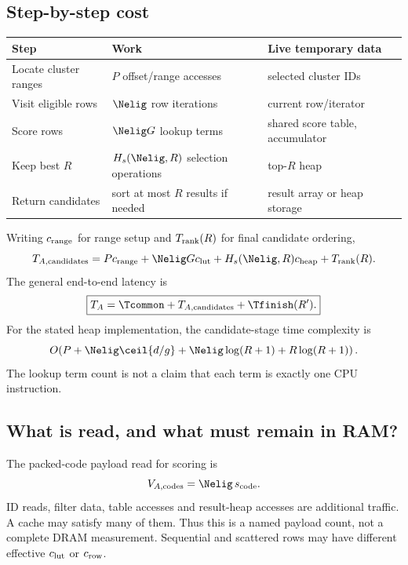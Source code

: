 \subsection{Step-by-step cost}
\begin{center}\small
\begin{tabularx}{\linewidth}{@{}P{.25\linewidth}YP{.23\linewidth}@{}}\toprule
Step & Work & Live temporary data\\\midrule
Locate cluster ranges & $P$ offset/range accesses & selected cluster IDs\\
Visit eligible rows & $\Nelig$ row iterations & current row/iterator\\
Score rows & $\Nelig G$ lookup terms & shared score table, accumulator\\
Keep best $R$ & $H_s(\Nelig,R)$ selection operations & top-$R$ heap\\
Return candidates & sort at most $R$ results if needed & result array or heap storage\\\bottomrule
\end{tabularx}\normalsize\end{center}

Writing $c_{\rm range}$ for range setup and $T_{\rm rank}(R)$ for final candidate ordering,
\begin{equation}
T_{A,\rm candidates}=P c_{\rm range}+\Nelig G c_{\rm lut}
                    +H_s(\Nelig,R)c_{\rm heap}+T_{\rm rank}(R).
\label{eq:scan-time}
\end{equation}
The general end-to-end latency is
\begin{equation}
\boxed{T_A=\Tcommon+T_{A,\rm candidates}+\Tfinish(R').}
\label{eq:scan-total}
\end{equation}
For the stated heap implementation, the candidate-stage time complexity is
\[
O\!\left(P+\Nelig\ceil{d/g}+\Nelig\log(R+1)+R\log(R+1)\right).
\]
The lookup term count is not a claim that each term is exactly one CPU instruction.

\subsection{What is read, and what must remain in RAM?}
The packed-code payload read for scoring is
\begin{equation}
V_{A,\rm codes}=\Nelig\,s_{\rm code}.
\end{equation}
ID reads, filter data, table accesses and result-heap accesses are additional traffic. A cache
may satisfy many of them. Thus this is a named payload count, not a complete DRAM measurement.
Sequential and scattered rows may have different effective $c_{\rm lut}$ or $c_{\rm row}$.

